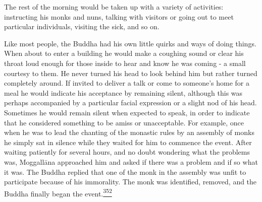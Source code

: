 The rest of the morning would be taken up with a variety of activities:
instructing his monks and nuns, talking with visitors or going out to
meet particular individuals, visiting the sick, and so on.

Like most people, the Buddha had his own little quirks and ways of doing
things. When about to enter a building he would make a coughing sound or
clear his throat loud enough for those inside to hear and know he was
coming - a small courtesy to them. He never turned his head to look
behind him but rather turned completely around. If invited to deliver a
talk or come to someone's home for a meal he would indicate his
acceptance by remaining silent, although this was perhaps accompanied by
a particular facial expression or a slight nod of his head. Sometimes he
would remain silent when expected to speak, in order to indicate that he
considered something to be amiss or unacceptable. For example, once when
he was to lead the chanting of the monastic rules by an assembly of
monks he simply sat in silence while they waited for him to commence the
event. After waiting patiently for several hours, and no doubt wondering
what the problems was, Moggallāna approached him and asked if there was
a problem and if so what it was. The Buddha replied that one of the monk
in the assembly was unfit to participate because of his immorality. The
monk was identified, removed, and the Buddha finally began the
event.\label{footprints_split_011.html_fnref352}\hyperref[footprints_split_024.htmlux5cux23fn352]{\textsuperscript{352}}

